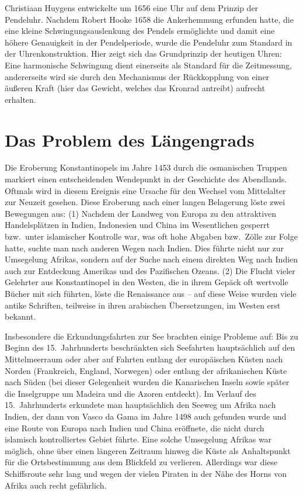 Christiaan Huygens 
entwickelte um 1656 eine Uhr auf dem Prinzip der Pendeluhr. Nachdem Robert Hooke
1658 die Ankerhemmung erfunden hatte, die eine kleine Schwingungsauslenkung des Pendels erm\"oglichte und damit
eine h\"ohere Genauigkeit in der Pendelperiode, wurde die Pendeluhr zum Standard in der Uhrenkonstruktion. 
Hier zeigt sich das Grundprinzip der heutigen Uhren: Eine harmonische Schwingung dient einerseits
als Standard f\"ur die Zeitmessung, andererseits wird sie durch den Mechanismus der R\"uckkopplung
von einer \"au\ss eren Kraft (hier das Gewicht, welches das Kronrad antreibt) aufrecht erhalten. 

\section{Das Problem des L\"angengrads}

Die Eroberung Konstantinopels 
im Jahre 1453 durch die osmanischen Truppen markiert einen
entscheidenden Wendepunkt in der Geschichte des Abendlands. Oftmals wird in diesem Ereignis eine 
Ursache f\"ur den Wechsel vom Mittelalter zur Neuzeit gesehen. Diese Eroberung nach einer
langen Belagerung l\"oste zwei Bewegungen aus:
(1) Nachdem der Landweg von Europa zu den attraktiven Handelspl\"atzen in Indien, 
Indonesien und China im Wesentlichen gesperrt bzw.\ unter islamischer Kontrolle war, was oft
hohe Abgaben bzw.\ Z\"olle zur Folge hatte,
suchte man nach anderen Wegen nach Indien. Dies f\"uhrte nicht nur zur Umsegelung Afrikas,
sondern auf der Suche nach einem direkten Weg nach Indien auch zur Entdeckung Amerikas und
des Pazifischen Ozeans. (2) Die Flucht vieler Gelehrter aus Konstantinopel in den Westen,
die in ihrem Gep\"ack oft wertvolle B\"ucher mit sich f\"uhrten, l\"oste die
Renaissance aus -- auf diese Weise wurden viele antike Schriften, teilweise in ihren
arabischen \"Ubersetzungen, im Westen erst bekannt.  

Insbesondere die Erkundungsfahrten zur See brachten einige Probleme auf: Bis zu Beginn
des 15.\ Jahrhunderts beschr\"ankten sich Seefahrten haupts\"achlich auf den Mittelmeerraum
oder aber auf Fahrten entlang der europ\"aischen K\"usten nach Norden (Frankreich, England, 
Norwegen) oder entlang der afrikanischen K\"uste nach S\"uden (bei dieser Gelegenheit wurden
die Kanarischen Inseln sowie sp\"ater die Inselgruppe um Madeira und die Azoren entdeckt). Im Verlauf
des 15.\ Jahrhunderts erkundete man haupts\"achlich den Seeweg um Afrika nach Indien, der
dann von Vasco da Gama 
im Jahre 1498 auch gefunden wurde und eine Route von
Europa nach Indien und China er\"offnete, die nicht durch islamisch
kontrolliertes Gebiet f\"uhrte. Eine solche Umsegelung Afrikas war
m\"oglich, ohne \"uber einen l\"angeren Zeitraum hinweg die K\"uste als Anhaltspunkt f\"ur die
Ortsbestimmung aus dem Blickfeld zu verlieren. Allerdings war diese Schiffsroute sehr lang
und wegen der vielen Piraten in der N\"ahe des Horns von Afrika auch recht gef\"ahrlich.

